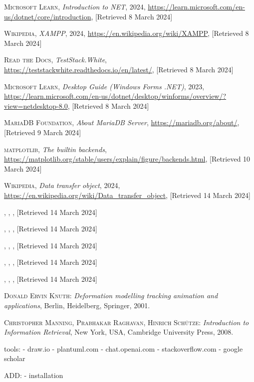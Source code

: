 \documentclass{thesis-ekf}
\theoremstyle{definition}
\theoremstyle{remark}
\begin{document}
\begin{thebibliography}{2}
\textsc{Microsoft Learn},
\emph{Introduction to NET}, 2024, 
\url{https://learn.microsoft.com/en-us/dotnet/core/introduction}, [Retrieved 8 March 2024]

\textsc{Wikipedia},
\emph{XAMPP}, 2024,
\url{https://en.wikipedia.org/wiki/XAMPP}, [Retrieved 8 March 2024]

\textsc{Read the Docs},
\emph{TestStack.White},
\url{https://teststackwhite.readthedocs.io/en/latest/}, [Retrieved 8 March 2024]

\textsc{Microsoft Learn},
\emph{Desktop Guide (Windows Forms .NET)}, 2023,
\url{https://learn.microsoft.com/en-us/dotnet/desktop/winforms/overview/?view=netdesktop-8.0}, [Retrieved 8 March 2024]

\textsc{MariaDB Foundation},
\emph{About MariaDB Server},
\url{https://mariadb.org/about/}, [Retrieved 9 March 2024]

\textsc{matplotlib},
\emph{The builtin backends},
\url{https://matplotlib.org/stable/users/explain/figure/backends.html}, [Retrieved 10 March 2024]

\textsc{Wikipedia},
\emph{Data transfer object}, 2024,
\url{https://en.wikipedia.org/wiki/Data_transfer_object}, [Retrieved 14 March 2024]

\bibitem{}
\textsc{},
\emph{},
\url{}, [Retrieved 14 March 2024]

\bibitem{}
\textsc{},
\emph{},
\url{}, [Retrieved 14 March 2024]

\bibitem{}
\textsc{},
\emph{},
\url{}, [Retrieved 14 March 2024]

\bibitem{}
\textsc{},
\emph{},
\url{}, [Retrieved 14 March 2024]

\bibitem{}
\textsc{},
\emph{},
\url{}, [Retrieved 14 March 2024]

\textsc{Donald Ervin Knuth}: 
\emph{Deformation modelling tracking animation and applications}, Berlin, Heidelberg, Springer, 2001.

\textsc{Christopher Manning, Prabhakar Raghavan, Hinrich Sch\"{u}tze}: 
\emph{Introduction to Information Retrieval}, New York, USA, Cambridge University Press, 2008.
\end{thebibliography}

tools:
- draw.io
- plantuml.com
- chat.openai.com
- stackoverflow.com
- google scholar

ADD:
- installation
\end{document}
